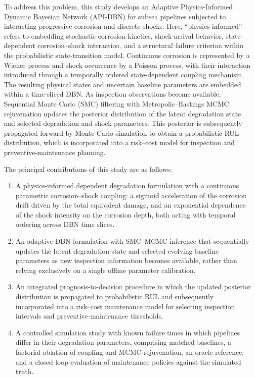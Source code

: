 \documentclass[journal]{IEEEtran}
\begin{document}
To address this problem, this study develops an Adaptive
Physics-Informed Dynamic Bayesian Network (API-DBN) for subsea
pipelines subjected to interacting progressive corrosion and discrete
shocks. Here, ``physics-informed'' refers to embedding stochastic
corrosion kinetics, shock-arrival behavior, state-dependent
corrosion--shock interaction, and a structural failure criterion within
the probabilistic state-transition model. Continuous corrosion is
represented by a Wiener process and shock occurrence by a Poisson
process, with their interaction introduced through a temporally
ordered state-dependent coupling mechanism. The resulting physical
states and uncertain baseline parameters are embedded within a
time-sliced DBN. As inspection observations become available,
Sequential Monte Carlo (SMC) filtering with Metropolis--Hastings MCMC
rejuvenation updates the posterior distribution of the latent
degradation state and selected degradation and shock parameters. This
posterior is subsequently propagated forward by Monte Carlo simulation
to obtain a probabilistic RUL distribution, which is incorporated into
a risk--cost model for inspection and preventive-maintenance planning.

The principal contributions of this study are as follows:
\begin{enumerate}
    \item A physics-informed dependent degradation formulation with a
    continuous parametric corrosion--shock coupling: a sigmoid
    acceleration of the corrosion drift driven by the total equivalent
    damage, and an exponential dependence of the shock intensity on the
    corrosion depth, both acting with temporal ordering across DBN time
    slices.

    \item An adaptive DBN formulation with SMC--MCMC inference that
    sequentially updates the latent degradation state and selected
    evolving baseline parameters as new inspection information becomes
    available, rather than relying exclusively on a single offline
    parameter calibration.

    \item An integrated prognosis-to-decision procedure in which the
    updated posterior distribution is propagated to probabilistic RUL
    and subsequently incorporated into a risk--cost maintenance model
    for selecting inspection intervals and preventive-maintenance
    thresholds.

    \item A controlled simulation study with known failure times in
    which pipelines differ in their degradation parameters, comprising
    matched baselines, a factorial ablation of coupling and MCMC
    rejuvenation, an oracle reference, and a closed-loop evaluation of
    maintenance policies against the simulated truth.
\end{enumerate}
\end{document}
